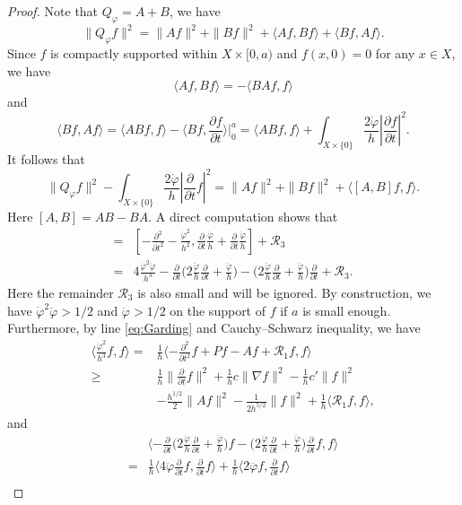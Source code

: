 \documentclass[12pt, reqno]{amsart}
\theoremstyle{plain}%
\theoremstyle{definition}
\theoremstyle{remark}
\numberwithin{equation}{section}
\begin{document}
\begin{proof}
	Note that $Q_\varphi=A+B$, we have
	$$\|Q_\varphi f\|^2=\|Af\|^2+\|Bf\|^2+\langle Af,Bf\rangle+\langle Bf,Af\rangle.$$
	Since  $f$ is compactly supported within $X\times[0,a)$ and $f(x,0)=0$ for any $x \in X$, we have
	$$\langle Af,Bf\rangle=-\langle BAf,f\rangle$$
	 and 
	 $$\langle Bf,Af\rangle=\langle ABf,f\rangle-\langle Bf,\frac{\partial f}{\partial t}\rangle\Big|_0^a=\langle ABf,f\rangle+\int_{X\times \{0\}}\frac{2\dot\varphi}{h}|\frac{\partial f}{\partial t}|^2.$$
	 It follows that
	 $$\|Q_\varphi f\|^2-\int_{X\times \{0\}}\frac{2\dot\varphi}{h}|\frac{\partial}{\partial t}f|^2=\|Af\|^2+\|Bf\|^2+\langle[A,B]f,f\rangle.$$
	 Here $[A, B] = AB - BA$.
	 A direct computation shows that
	 \begin{align*}
	 	[A,B]=&[-\frac{\partial^2}{\partial t^2}-\frac{\dot\varphi^2}{h^2},\frac{\partial}{\partial t}\frac{\dot\varphi}{h} + \frac{\partial}{\partial t}\frac{\dot\varphi}{h}]+\mathscr R_3\\
	 	=&4\frac{\dot\varphi^2\ddot\varphi}{h^3}
	 	-\frac{\partial}{\partial t}\Big(2\frac{\ddot\varphi}{h}\frac{\partial}{\partial t}+\frac{\dddot\varphi}{h}\Big)-\Big(2\frac{\ddot\varphi}{h}\frac{\partial}{\partial t}+\frac{\dddot\varphi}{h}\Big)\frac{\partial}{\partial t}
	 	+\mathscr R_3.
	 \end{align*}
	 Here the remainder $\mathscr R_3$ is also small and will be ignored. By construction, we have $\dot\varphi^2\ddot\varphi>1/2$ and $\ddot\varphi>1/2$ on the support of $f$ if $a$ is small enough. Furthermore, by line \eqref{eq:Garding} and Cauchy--Schwarz inequality, we have
	 \begin{align*}
	 	\langle\frac{\dot\varphi^2}{h^3}f,f\rangle=&\frac 1 h\langle-\frac{\partial^2}{\partial t^2}f+Pf-Af+\mathscr R_1 f,f\rangle\\
	 	\geq& \frac 1 h\|\frac{\partial}{\partial t}f\|^2+\frac 1 h c\|\nabla f\|^2-\frac 1 h c'\|f\|^2\\
	 	&-\frac{h^{1/2}}{2}\|Af\|^2-\frac{1}{2h^{5/2}}\|f\|^2+\frac 1 h\langle\mathscr R_1 f,f\rangle,
	 \end{align*}
	 and
	 \begin{align*}
	 	&\langle-\frac{\partial}{\partial t}\Big(2\frac{\ddot\varphi}{h}\frac{\partial}{\partial t}+\frac{\dddot\varphi}{h}\Big)f-\Big(2\frac{\ddot\varphi}{h}\frac{\partial}{\partial t}+\frac{\dddot\varphi}{h}\Big)\frac{\partial}{\partial t} f,f\rangle\\
	 	=&\frac 1 h\langle{4\ddot\varphi}\frac{\partial}{\partial t}f,\frac{\partial}{\partial t}f\rangle +
	 	\frac 1 h\langle2\dddot\varphi f,\frac{\partial}{\partial t} f\rangle\\

\end{align*}
\end{proof}
\end{document}
